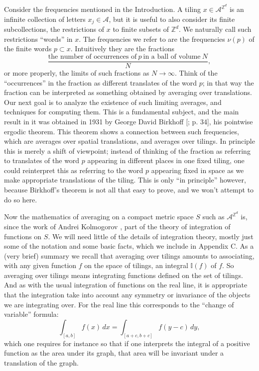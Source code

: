 \documentclass[reqno]{stml-l}
\theoremstyle{plain}
\theoremstyle{definition}
\numberwithin{equation}{chapter}
\begin{document}
Consider the frequencies mentioned in the Introduction. A tiling $x\in \mathcal{A}^{\mathbb{Z}^{d}}$ is an infinite collection of letters $x_{j}\in \mathcal{A}$, but it is useful to also consider its finite subcollections, the restrictions of $x$ to finite subsets of $\mathbb{Z}^{d}$. We naturally call such restrictions ``words'' in $x$. The frequencies we refer to are the frequencies $\nu(p)$ of the finite words $p\subset x$. Intuitively they are the fractions
\begin{equation}\label{ch01:eqn1.5}
\frac{\mbox{the number of occurrences of}\ p\ \mbox{in a ball of volume}\
N}{N},
\end{equation}
or more properly, the limits of such fractions as $N\rightarrow\infty$. Think of the ``occurrences'' in the fraction as different translates of the word $p$; in that way the fraction can be interpreted as something obtained by averaging over translations. Our next goal is to analyze the existence of such limiting averages, and techniques for computing them. This is a fundamental subject, and the main result in it was obtained in 1931 by George David Birkhoff [; p. 34], his pointwise ergodic theorem. This theorem shows a connection between such frequencies, which are averages over spatial translations, and averages over tilings. In principle this is merely a shift of viewpoint; instead of thinking of the fraction as referring to translates of the word $p$ appearing in different places in one fixed tiling, one could reinterpret this as referring to the
word $p$ appearing fixed in space as we make appropriate translations of the tiling. This is only ``in principle'' however, because Birkhoff's theorem is not all that easy to prove, and we won't attempt to do so here.

Now the mathematics of averaging on a compact metric space $S$ such as $\mathcal{A}^{\mathbb{Z}^{d}}$ is, since the work of Andrei Kolmogorov \cite{bib:Kol}, part of the theory of integration of functions on $S$. We will need little of the details of integration theory, mostly just some of the notation and some basic facts, which we include in Appendix C. As a (very brief) summary we recall that averaging over tilings amounts to associating, with any given function $f$ on the space of tilings, an integral $\mathbb{I}(f)$ of $f$. So averaging over tilings means integrating functions defined on the set of tilings. And as with the usual integration of functions on the real line, it is appropriate that the integration take into account any symmetry or invariance of the objects we are integrating over. For the real line this corresponds to the ``change of variable'' formula:
\begin{equation}\label{ch01:eqn1.6}
\int_{[a,b]}f(x)\,dx=\int_{[a+c,b+c]}f(y-c)\,dy,
\end{equation}
which one requires for instance so that if one interprets the integral of a positive function as the area under its graph, that area will be invariant under a translation of the graph.
\end{document}
